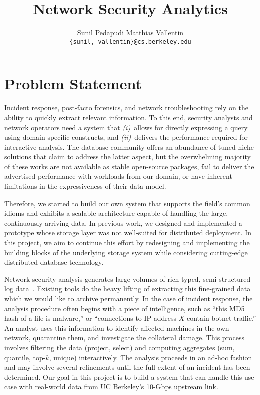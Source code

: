 \documentclass[11pt]{article}
\title{Network Security Analytics}
\author{Sunil Pedapudi \qquad Matthias Vallentin\\
\small \texttt{\{sunil, vallentin\}@cs.berkeley.edu}
}
\date{}
\def\first{\emph{(i)}~}
\def\second{\emph{(ii)}~}
\begin{document}
\maketitle

\section{Problem Statement}

Incident response, post-facto forensics, and network troubleshooting rely on
the ability to quickly extract relevant information. To this end, security
analysts and network operators need a system that \first allows for directly
expressing a query using domain-specific constructs, and \second delivers the
performance required for interactive analysis. The database community offers an
abundance of tuned niche solutions that claim to address the latter aspect, but
the overwhelming majority of these works are not available as stable
open-source packages, fail to deliver the advertised performance with workloads
from our domain, or have inherent limitations in the expressiveness of their
data model.

Therefore, we started to build our own system that supports the field's common
idioms and exhibits a scalable architecture capable of handling the large,
continuously arriving data. In previous work, we designed and implemented a
prototype whose storage layer was not well-suited for distributed deployment.
In this project, we aim to continue this effort by redesigning and
implementing the building blocks of the underlying storage system while
considering cutting-edge distributed database technology. 

Network security analysis generates large volumes of rich-typed,
semi-structured log data~\cite{Melnik10}. Existing tools do the heavy lifting
of extracting this fine-grained data~\cite{Paxson99} which we would like to
archive permanently. In the case of incident response, the analysis procedure
often begins with a piece of intelligence, such as ``this MD5 hash of a file is
malware,'' or ``connections to IP address $X$ contain botnet traffic.'' An
analyst uses this information to identify affected machines in the own network,
quarantine them, and investigate the collateral damage. This process involves
filtering the data (project, select) and computing aggregates (sum, quantile,
top-$k$, unique) interactively. The analysis proceeds in an ad-hoc fashion and
may involve several refinements until the full extent of an incident has been
determined. Our goal in this project is to build a system that can handle this
use case with real-world data from UC Berkeley's 10-Gbps upstream link.
\end{document}
